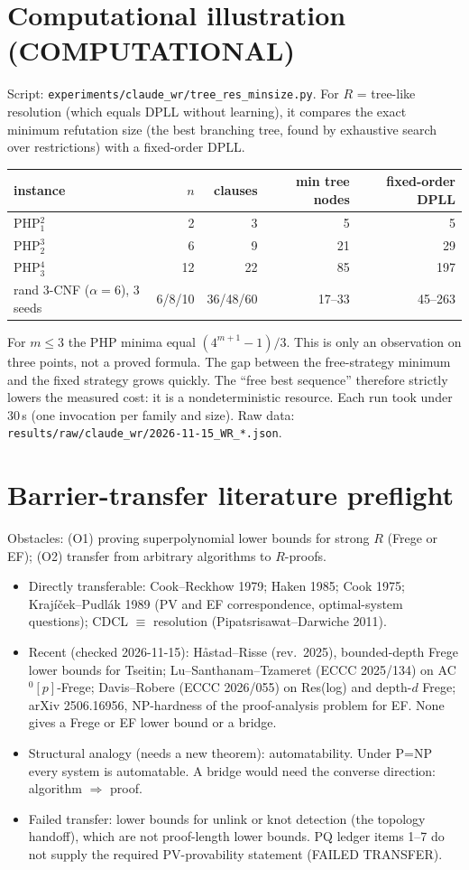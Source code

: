 \documentclass[11pt]{article}
\theoremstyle{definition}\newtheorem{definition}{Definition}
\begin{document}
\section{Computational illustration (COMPUTATIONAL)}
Script: \texttt{experiments/claude\_wr/tree\_res\_minsize.py}. For $R$ = tree-like resolution (which equals DPLL without learning), it compares the exact minimum refutation size (the best branching tree, found by exhaustive search over restrictions) with a fixed-order DPLL.
\begin{center}\begin{tabular}{lrrrr}
instance & $n$ & clauses & min tree nodes & fixed-order DPLL\\\hline
PHP$^{2}_{1}$ & 2 & 3 & 5 & 5\\
PHP$^{3}_{2}$ & 6 & 9 & 21 & 29\\
PHP$^{4}_{3}$ & 12 & 22 & 85 & 197\\
rand 3-CNF ($\alpha=6$), 3 seeds & 6/8/10 & 36/48/60 & 17--33 & 45--263
\end{tabular}\end{center}
For $m\le3$ the PHP minima equal $(4^{m+1}-1)/3$. This is only an observation on three points, not a proved formula. The gap between the free-strategy minimum and the fixed strategy grows quickly. The ``free best sequence'' therefore strictly lowers the measured cost: it is a nondeterministic resource.
Each run took under 30\,s (one invocation per family and size). Raw data: \texttt{results/raw/claude\_wr/2026-11-15\_WR\_*.json}.

\section{Barrier-transfer literature preflight}
Obstacles: (O1) proving superpolynomial lower bounds for strong $R$ (Frege or EF); (O2) transfer from arbitrary algorithms to $R$-proofs.
\begin{itemize}
\item Directly transferable: Cook--Reckhow 1979; Haken 1985; Cook 1975; Krajíček--Pudlák 1989 (PV and EF correspondence, optimal-system questions); CDCL $\equiv$ resolution (Pipatsrisawat--Darwiche 2011).
\item Recent (checked 2026-11-15): Håstad--Risse (rev.\ 2025), bounded-depth Frege lower bounds for Tseitin; Lu--Santhanam--Tzameret (ECCC 2025/134) on AC$^0[p]$-Frege; Davis--Robere (ECCC 2026/055) on Res(log) and depth-$d$ Frege; arXiv 2506.16956, NP-hardness of the proof-analysis problem for EF. None gives a Frege or EF lower bound or a bridge.
\item Structural analogy (needs a new theorem): automatability. Under P=NP every system is automatable. A bridge would need the converse direction: algorithm $\Rightarrow$ proof.
\item Failed transfer: lower bounds for unlink or knot detection (the topology handoff), which are not proof-length lower bounds. PQ ledger items 1--7 do not supply the required PV-provability statement (FAILED TRANSFER).
\end{itemize}
\end{document}
